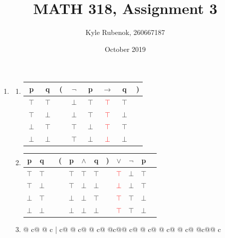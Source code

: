 \documentclass{article}
\title{MATH 318, Assignment 3}
\author{Kyle Rubenok, 260667187}
\date{October 2019}
\begin{document}
\maketitle

    \begin{enumerate}
        \item 
            \begin{enumerate}
                \item
                    \begin{tabular}{ c  c | c  c  c  c  c  c }
                    p & q & ( & $\neg$ & p & $\rightarrow$ & q & )\\
                    \hline 
                    $\top$ & $\top$ &  & $\perp$ & $\top$ & \textcolor{red}{$\top$} & $\top$ & \\
                    $\top$ & $\perp$ &  & $\perp$ & $\top$ & \textcolor{red}{$\top$} & $\perp$ & \\
                    $\perp$ & $\top$ &  & $\top$ & $\perp$ & \textcolor{red}{$\top$} & $\top$ & \\
                    $\perp$ & $\perp$ &  & $\top$ & $\perp$ & \textcolor{red}{$\perp$} & $\perp$ & \\
                    \end{tabular}
                \item
                    \begin{tabular}{@{ }c@{ }@{ }c | c@{ }@{}c@{}@{ }c@{ }@{ }c@{ }@{ }c@{ }@{}c@{}@{ }c@{ }    @{ }c@{ }@{ }c@{ }@{ }c} p & q &  & ( & p & $\land$ & q & ) & $\lor$ & $\neg$ & p & \\
                    \hline 
                    $\top$ & $\top$ &  &  & $\top$ & $\top$ & $\top$ &  & \textcolor{red}{$\top$} & $\bot$ &     $\top$ & \\
                    $\top$ & $\bot$ &  &  & $\top$ & $\bot$ & $\bot$ &  & \textcolor{red}{$\bot$} & $\bot$ &     $\top$ & \\
                    $\bot$ & $\top$ &  &  & $\bot$ & $\bot$ & $\top$ &  & \textcolor{red}{$\top$} & $\top$ &     $\bot$ & \\
                    $\bot$ & $\bot$ &  &  & $\bot$ & $\bot$ & $\bot$ &  & \textcolor{red}{$\top$} & $\top$ &     $\bot$ & \\
                    \end{tabular}
                \item
                    \begin{tabular}{@{ }c@{ }@{ }c | c@{ }@{ }c@{ }@{ }c@{ }@{}c@{}@{ }c@{ }@{ }c@{ }@{ }c@ { }@{ }c@{ }@{}c@{}@{ }c}

\end{tabular}
\end{enumerate}
\end{enumerate}
\end{document}
